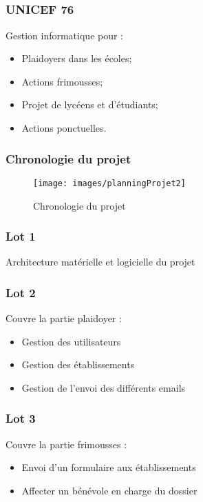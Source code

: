 \speaker{\Mathieu}
\subsection{} %



\begin{frame}
\frametitle{UNICEF 76}
Gestion informatique pour :
	\begin{itemize}
		\item Plaidoyers dans les \'ecoles;
		\item Actions frimousses;
		\item Projet de lycéens et d'étudiants;
		\item Actions ponctuelles.
	\end{itemize}
\end{frame}




\begin{frame}
	\frametitle{Chronologie du projet}
	\begin{figure}
		\begin{landscape}
		\texttt{[image: images/planningProjet2]}
		\end{landscape}
        \caption{Chronologie du projet}
	\end{figure} 
\end{frame}




\begin{frame}
	\frametitle{Lot 1}
	Architecture matérielle et logicielle du projet
\end{frame}


\speaker{\Michel}
\begin{frame}
	\frametitle{Lot 2}
	Couvre la partie plaidoyer :
	\begin{itemize}
		\item Gestion des utilisateurs
		\item Gestion des établissements
		\item Gestion de l'envoi des différents emails
	\end{itemize}
\end{frame}

\begin{frame}
	\frametitle{Lot 3}
	Couvre la partie frimousses :
	\begin{itemize}
		\item Envoi d'un formulaire aux établissements
		\item Affecter un bénévole en charge du dossier
	\end{itemize}
\end{frame}


